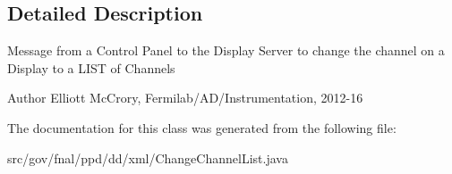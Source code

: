 \subsection{Detailed Description}
Message from a Control Panel to the Display Server to change the channel on a Display to a L\-I\-S\-T of Channels

\begin{DoxyAuthor}{Author}
Elliott Mc\-Crory, Fermilab/\-A\-D/\-Instrumentation, 2012-\/16 
\end{DoxyAuthor}


The documentation for this class was generated from the following file\-:\begin{DoxyCompactItemize}
\item 
src/gov/fnal/ppd/dd/xml/Change\-Channel\-List.\-java\end{DoxyCompactItemize}
